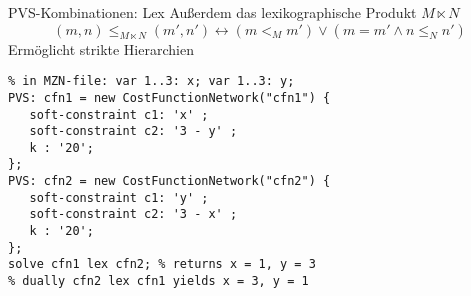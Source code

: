 \begin{frame}[fragile]{PVS-Kombinationen: Lex}
Außerdem das \alert{lexikographische} Produkt $M \ltimes N$ 
\[
(m, n) \leq_{M \ltimes N} (m', n') \leftrightarrow (m <_M m') \vee (m = m' \wedge n \leq_N n')
\]
Ermöglicht strikte Hierarchien
\begin{lstlisting}
% in MZN-file: var 1..3: x; var 1..3: y;
PVS: cfn1 = new CostFunctionNetwork("cfn1") {
   soft-constraint c1: 'x' ;
   soft-constraint c2: '3 - y' ;
   k : '20';
}; 
PVS: cfn2 = new CostFunctionNetwork("cfn2") {
   soft-constraint c1: 'y' ;
   soft-constraint c2: '3 - x' ;
   k : '20';
};
solve cfn1 lex cfn2; % returns x = 1, y = 3
% dually cfn2 lex cfn1 yields x = 3, y = 1 
\end{lstlisting}
\end{frame}
